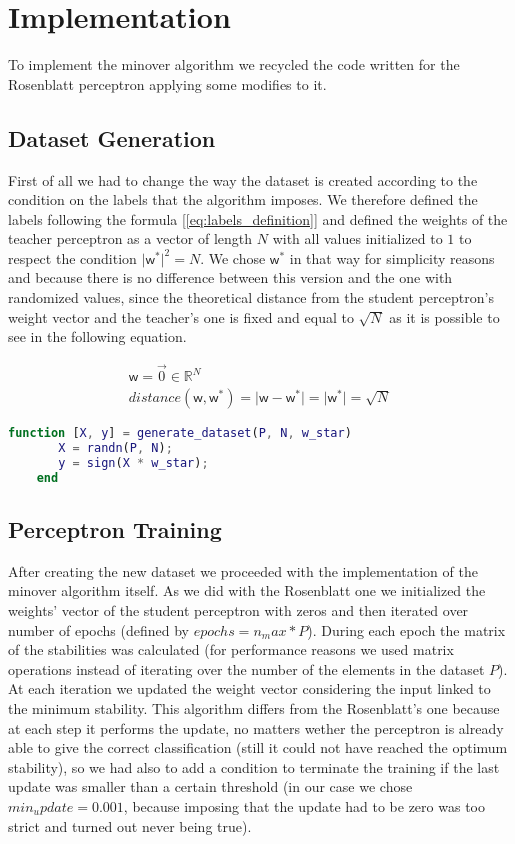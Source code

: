 \section{Implementation}
\label{sec:implementation}

To implement the minover algorithm we recycled the code written for the Rosenblatt perceptron applying some modifies to it.

\subsection{Dataset Generation}
First of all we had to change the way the dataset is created according to the condition on the labels that the algorithm imposes.
We therefore defined the labels following the formula [\ref{eq:labels_definition}] and defined the weights of the teacher perceptron
as a vector of length $N$ with all values initialized to $1$ to respect the condition $\lvert \bm{\mathsf{w}}^* \rvert^2 = N$.
We chose $\bm{\mathsf{w}}^*$ in that way for simplicity reasons and because there is no difference between this version and
the one with randomized values, since the theoretical distance from the student perceptron's weight vector and the teacher's one is
fixed and equal to $\sqrt{N}$ as it is possible to see in the following equation.

\begin{gather*}
    \bm{\mathsf{w}} = \overrightarrow{0} \in \mathbb{R}^N \\
    distance(\bm{\mathsf{w}}, \bm{\mathsf{w}}^*) = \lvert \bm{\mathsf{w}} - \bm{\mathsf{w}}^* \rvert = \lvert \bm{\mathsf{w}}^* \rvert = \sqrt{N}
\end{gather*}

\begin{lstlisting}[language=Matlab]
    function [X, y] = generate_dataset(P, N, w_star)
       X = randn(P, N);
       y = sign(X * w_star);
    end
\end{lstlisting}

\subsection{Perceptron Training}
After creating the new dataset we proceeded with the implementation of the minover algorithm itself. As we did with the Rosenblatt one
we initialized the weights' vector of the student perceptron with zeros and then iterated over number of epochs (defined by $epochs = n_max * P$).
During each epoch the matrix of the stabilities was calculated (for performance reasons we used matrix operations instead of iterating over the
number of the elements in the dataset $P$). At each iteration we updated the weight vector considering the input linked to the minimum stability.
This algorithm differs from the Rosenblatt's one because at each step it performs the update, no matters wether the perceptron is already able to give
the correct classification (still it could not have reached the optimum stability), so we had also to add a condition to terminate the training if the
last update was smaller than a certain threshold (in our case we chose $min_update = 0.001$, because imposing that the update had to be zero was too
strict and turned out never being true).

